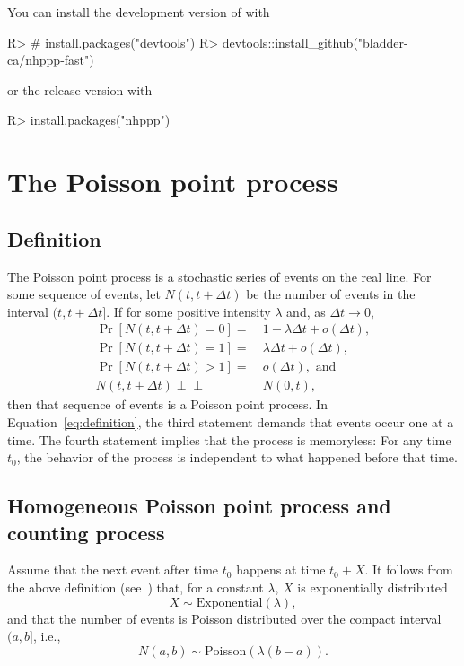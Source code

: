 \documentclass[article]{jss}\usepackage[]{graphicx}\usepackage[]{xcolor}
\newcommand{\indep}{\perp \!\!\! \perp}
\begin{document}
You can install the development version of  with
\begin{Schunk}
\begin{Sinput}
R> # install.packages("devtools")
R> devtools::install_github("bladder-ca/nhppp-fast")
\end{Sinput}
\end{Schunk}
or the release version with
\begin{Schunk}
\begin{Sinput}
R> install.packages("nhppp")
\end{Sinput}
\end{Schunk}
\section{The Poisson point process} \label{sec:review}
\subsection{Definition}
The Poisson point process is a stochastic series of events on the real line. For some sequence of events, let $N(t, t + \Delta t)$ be the number of events in the interval $(t, t  + \Delta t]$. If for some positive intensity $\lambda$ and, as ${\Delta t \rightarrow 0}$,
\begin{equation}\label{eq:definition}
    \begin{aligned}
    \Pr[N(t, t + \Delta t) = 0] =&\  1 - \lambda \Delta t +  o(\Delta t), \\
    \Pr[N(t, t + \Delta t) = 1] =&\  \lambda \Delta t +  o(\Delta t), \\
    \Pr[N(t, t + \Delta t) >1] =&\  o(\Delta t),\text{ and } \\
    N(t, t + \Delta t) \indep&\ N(0, t),
    \end{aligned}
\end{equation}
then that sequence of events is a Poisson point process. In Equation~\eqref{eq:definition}, the third statement demands that events occur one at a time. The fourth statement implies that the process is memoryless: For any time $t_0$, the behavior of the process is independent to what happened before that time.

\subsection{Homogeneous Poisson point process and counting process}\label{sec:ppp-intro}
Assume that the next event after time $t_0$ happens at time $t_0 + X$. It follows from the above definition (see~\citet[par. 4.1]{cox1965theory}) that, for a constant $\lambda$, $X$ is exponentially distributed
\begin{equation}\label{eq:X_PPP}
X \sim \text{Exponential}(\lambda),
\end{equation}
and that the number of events is Poisson distributed over the compact interval $(a, b]$, i.e.,
\begin{equation}\label{eq:N_PPP}
N(a, b) \sim \text{Poisson}(\lambda (b-a)).
\end{equation}
\end{document}
